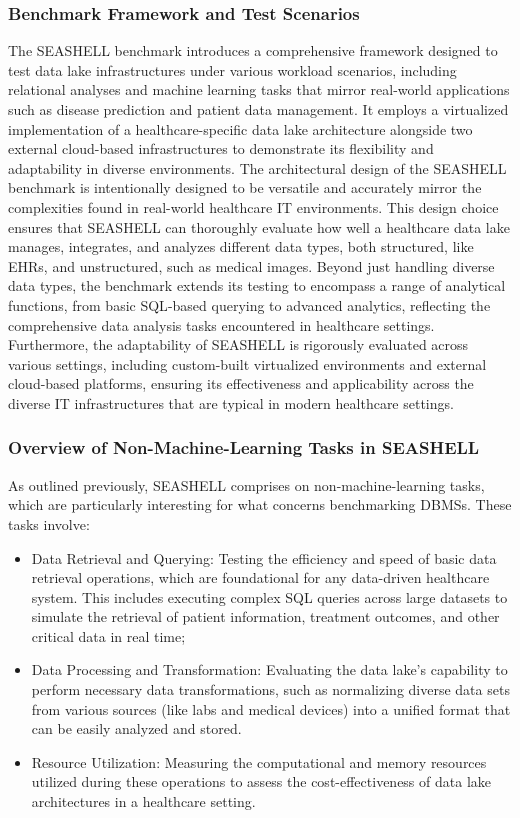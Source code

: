 \subsubsection{Benchmark Framework and Test Scenarios}
The \ac{SEASHELL} benchmark introduces a comprehensive framework designed to test data lake infrastructures under various workload scenarios, including relational analyses and machine learning tasks that mirror real-world applications such as disease prediction and patient data management. It employs a virtualized implementation of a healthcare-specific data lake architecture alongside two external cloud-based infrastructures to demonstrate its flexibility and adaptability in diverse environments. The architectural design of the \ac{SEASHELL} benchmark is intentionally designed to be versatile and accurately mirror the complexities found in real-world healthcare \ac{IT} environments. This design choice ensures that \ac{SEASHELL} can thoroughly evaluate how well a healthcare data lake manages, integrates, and analyzes different data types, both structured, like \ac{EHR}s, and unstructured, such as medical images. Beyond just handling diverse data types, the benchmark extends its testing to encompass a range of analytical functions, from basic \ac{SQL}-based querying to advanced analytics, reflecting the comprehensive data analysis tasks encountered in healthcare settings. Furthermore, the adaptability of \ac{SEASHELL} is rigorously evaluated across various settings, including custom-built virtualized environments and external cloud-based platforms, ensuring its effectiveness and applicability across the diverse \ac{IT} infrastructures that are typical in modern healthcare settings.
\subsubsection{Overview of Non-Machine-Learning Tasks in SEASHELL}
As outlined previously, \ac{SEASHELL} comprises on non-machine-learning tasks, which are particularly interesting for what concerns benchmarking \ac{DBMS}s. These tasks involve:
\begin{itemize}
	\item Data Retrieval and Querying: Testing the efficiency and speed of basic data retrieval operations, which are foundational for any data-driven healthcare system. This includes executing complex \ac{SQL} queries across large datasets to simulate the retrieval of patient information, treatment outcomes, and other critical data in real time;
	\item Data Processing and Transformation: Evaluating the data lake's capability to perform necessary data transformations, such as normalizing diverse data sets from various sources (like labs and medical devices) into a unified format that can be easily analyzed and stored.
	\item Resource Utilization: Measuring the computational and memory resources utilized during these operations to assess the cost-effectiveness of data lake architectures in a healthcare setting.
\end{itemize}
